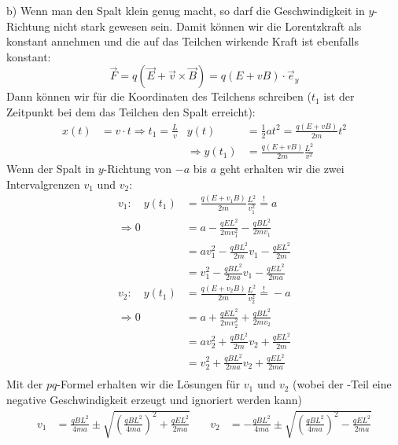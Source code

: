 \documentclass[11pt a4paper]{article}
\begin{document}
\vspace{0.5cm}
b) Wenn man den Spalt klein genug macht, so darf die Geschwindigkeit in 
$y$-Richtung nicht stark gewesen sein. Damit können wir die Lorentzkraft 
als konstant annehmen und die auf das Teilchen wirkende Kraft ist 
ebenfalls konstant:
\[ \vec F = q (\vec E + \vec v \times \vec B) = q(E+vB) \cdot \vec e_y \]
Dann können wir für die Koordinaten des Teilchens schreiben ($t_1$ ist 
der Zeitpunkt bei dem das Teilchen den Spalt erreicht):
\begin{align*}
	x(t) &= v\cdot t \Rightarrow t_1 = \frac Lv 
	&
	y(t) &= \frac12 at^2 
	= \frac{q(E+vB)}{2m} t^2 \\ &&
	\Rightarrow
	y(t_1) &= \frac{q(E+vB)}{2m} \frac{L^2}{v^2}
\end{align*}
Wenn der Spalt in $y$-Richtung von $-a$ bis $a$ geht erhalten wir die 
zwei Intervalgrenzen $v_1$ und $v_2$:
\begin{align*}
	v_1: \quad
	y(t_1) &= \frac{q(E+v_1 B)}{2m} \frac{L^2}{v_1^2} 
	\overset != a \\
	\Rightarrow
	0 &= a - \frac{qEL^2}{2m v_1^2} - \frac{q B L^2}{2m v_1} \\
	&= av_1^2 - \frac{q B L^2}{2m} v_1 - \frac{qEL^2}{2m} \\
	&= v_1^2 - \frac{q B L^2}{2m a} v_1 - \frac{qEL^2}{2m a} \\
	v_2: \quad
	y(t_1) &= \frac{q(E+v_2 B)}{2m} \frac{L^2}{v_2^2} 
	\overset != -a \\
	\Rightarrow
	0 &= a + \frac{qEL^2}{2m v_2^2} + \frac{q B L^2}{2m v_2} \\
	&= av_2^2 + \frac{q B L^2}{2m} v_2 + \frac{qEL^2}{2m} \\
	&= v_2^2 + \frac{q B L^2}{2m a} v_2 + \frac{qEL^2}{2m a} \\
\end{align*}
\newpage
Mit der $pq$-Formel erhalten wir die Lösungen für $v_1$ und $v_2$ (wobei 
der -Teil eine negative Geschwindigkeit erzeugt und ignoriert werden kann)
\begin{align*}
	v_1 &= \frac{q B L^2}{4m a} \pm \sqrt{
		\left(\frac{q B L^2}{4m a}\right)^2 + \frac{qEL^2}{2m a}
	}
	\quad
	&
	v_2 &= -\frac{q B L^2}{4m a} \pm \sqrt{
		\left(\frac{q B L^2}{4m a}\right)^2 - \frac{qEL^2}{2m a}
	}
\end{align*}
	
\end{document}
